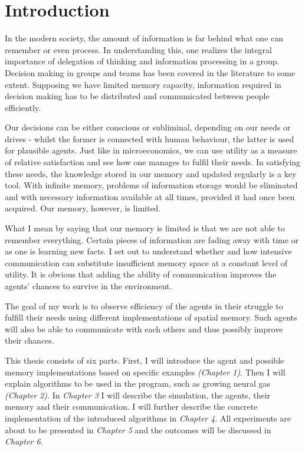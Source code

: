 \chapter*{Introduction}

In the modern society, the amount of information is far behind what one can remember or even process. In understanding this, one realizes the integral importance of delegation of thinking and information processing in a group. Decision making in groups and teams has been covered in the literature to some extent. \cite{Black:groupdecisionmaking} Supposing we have limited memory capacity, information required in decision making has to be distributed and communicated between people efficiently.

Our decisions can be either conscious or subliminal, depending on our needs or drives - whilst the former is connected with human behaviour, the latter is used for plausible agents. Just like in microeconomics, we can use utility as a measure of relative satisfaction \cite{Varian:micro} and see how one manages to fulfil their needs. In satisfying these needs, the knowledge stored in our memory and updated regularly is a key tool. With infinite memory, problems of information storage would be eliminated and with necessary information available at all times, provided it had once been acquired. Our memory, however, is limited. 

What I mean by saying that our memory is limited is that we are not able to remember everything. Certain pieces of information are fading away with time or as one is learning new facts. I set out to understand whether and how intensive communication can substitute insufficient memory space at a constant level of utility. It is obvious that adding the ability of communication improves the agents' chances to survive in the environment.

The goal of my work is to observe efficiency of the agents in their struggle to fulfill their needs using different implementations of spatial memory. Such agents will also be able to communicate with each others and thus possibly improve their chances.

This thesis consists of six parts. First, I will introduce the agent and possible memory implementations based on specific examples \emph{(Chapter 1)}. Then I will explain algorithms to be used in the program, such as growing neural gas \emph{(Chapter 2)}. In \emph{Chapter 3} I will describe the simulation, the agents, their memory and their communication. I will further describe the concrete implementation of the introduced algorithms in \emph{Chapter 4}. All experiments are about to be presented in \emph{Chapter 5} and the outcomes will be discussed in \emph{Chapter 6}.